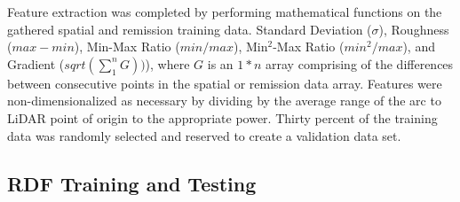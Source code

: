 \documentclass[balance,upint,subscriptcorrection,varvw,mathalfa=cal=boondoxo,colorlinks]{asmeconf}
\begin{document}
	
	{Feature extraction was completed by performing mathematical functions on the gathered spatial and remission training data. Standard Deviation ($\sigma$), Roughness ($max - min$), Min-Max Ratio ($min / max$), Min$^{2}$-Max Ratio ($min^2 / max$), and Gradient ($sqrt(\sum_{1}^{n} G))$), where $G$ is an $1*n$ array comprising of the differences between consecutive points in the spatial or remission data array. Features were non-dimensionalized as necessary by dividing by the average range of the arc to LiDAR point of origin to the appropriate power. Thirty percent of the training data was randomly selected and reserved to create a validation data set.} 
	
		
	\subsection{RDF Training and Testing}
\end{document}
